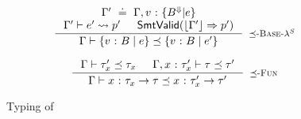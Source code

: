 \begin{figure}[!t]
$$
\inference{
\env' \defeq \env,\tbind{v}{\{\btyp^\tlabel | \refa\}} \\
\tologicshort{\env'}{\refa'}{\tbool}{\pred'}{}{}{} &
\smtvalid{\vcond{\env'}{\pred'}}
}{
	\issubtype{\env}{\tref{v}{\btyp}{\refa}}{\tref{v}{\btyp}{\refa'}}
}[\rsubbase]
$$

$$
\inference{
	\issubtype{\env}{\typ_x'}{\typ_x} &
	\issubtype{\env,\tbind{x}{\typ_x'}}{\typ}{\typ'}
}{
	\issubtype{\env}{\tfun{x}{\typ_x}{\typ}}{\tfun{x}{\typ_x'}{\typ'}}
}[\rsubfun]
$$
\caption{Typing of \corelan}
\label{fig:typing}
\end{figure}